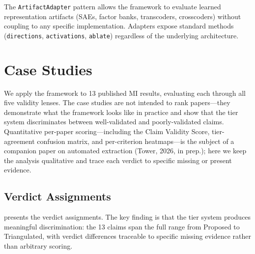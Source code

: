 \documentclass[10pt]{article}
\begin{document}
The \texttt{ArtifactAdapter} pattern allows the framework to evaluate learned representation artifacts (SAEs, factor banks, transcoders, crosscoders) without coupling to any specific implementation. Adapters expose standard methods (\texttt{directions}, \texttt{activations}, \texttt{ablate}) regardless of the underlying architecture.

\section{Case Studies}
\label{sec:case-studies}

We apply the framework to 13 published MI results, evaluating each through all five validity lenses. The case studies are not intended to rank papers---they demonstrate what the framework looks like in practice and show that the tier system discriminates between well-validated and poorly-validated claims. Quantitative per-paper scoring---including the Claim Validity Score, tier-agreement confusion matrix, and per-criterion heatmaps---is the subject of a companion paper on automated extraction (Tower, 2026, in prep.); here we keep the analysis qualitative and trace each verdict to specific missing or present evidence.

\subsection{Verdict Assignments}

 presents the verdict assignments. The key finding is that the tier system produces meaningful discrimination: the 13 claims span the full range from Proposed to Triangulated, with verdict differences traceable to specific missing evidence rather than arbitrary scoring.
\end{document}
